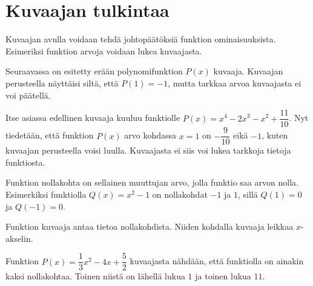 \section*{Kuvaajan tulkintaa}


Kuvaajan avulla voidaan tehdä johtopäätöksiä funktion ominaisuuksista.
Esimeriksi funktion arvoja voidaan lukea kuvaajasta.

\begin{esimerkki}
Seuraavassa on esitetty erään polynomifunktion $P(x)$ kuvaaja. Kuvaajan perusteella näyttäisi siltä, että $P(1)=-1$, mutta tarkkaa arvoa kuvaajasta ei voi päätellä.

\begin{kuvaajapohja}{1}{-2}{2}{-2}{2}
\end{kuvaajapohja}

Itse asiassa edellinen kuvaaja kuuluu funktiolle $P(x)=x^4-2x^3-x^2+\dfrac{11}{10}$. Nyt tiedetään, että funktion $P(x)$ arvo kohdassa $x=1$ on $-\dfrac{9}{10}$ eikä $-1$, kuten kuvaajan perusteella voisi luulla. Kuvaajasta ei siis voi lukea tarkkoja tietoja funktiosta.
\end{esimerkki}

Funktion nollakohta on sellainen muuttujan arvo, jolla funktio saa arvon nolla. Esimerkiksi funktiolla $Q(x)=x^2-1$
on nollakohdat $-1$ ja $1$, sillä $Q(1)=0$ ja $Q(-1)=0$.

Funktion kuvaaja antaa tietoa nollakohdista. Niiden kohdalla kuvaaja leikkaa $x$-akselin.

\begin{esimerkki}
Funktion $P(x) = \dfrac{1}{3}x^2-4x+\dfrac{5}{2}$ kuvaajasta nähdään, että funktiolla on ainakin kaksi nollakohtaa. Toinen niistä on lähellä lukua $1$ ja toinen lukua $11$.

\begin{kuvaajapohja}{0.3}{-5}{15}{-10}{5}
\end{kuvaajapohja}
\end{esimerkki}


